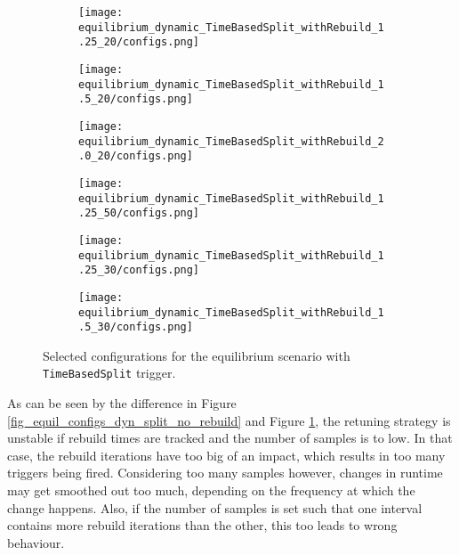 \documentclass[]{article}
\begin{document}
\begin{figure}[H]
	\begin{center}
		\begin{subfigure}[b]{0.3\textwidth}
			\texttt{[image: equilibrium\_dynamic\_TimeBasedSplit\_withRebuild\_1.25\_20/configs.png]}
		\end{subfigure}
		\begin{subfigure}[b]{0.3\textwidth}
			\texttt{[image: equilibrium\_dynamic\_TimeBasedSplit\_withRebuild\_1.5\_20/configs.png]}
		\end{subfigure}
		\begin{subfigure}[b]{0.3\textwidth}
			\texttt{[image: equilibrium\_dynamic\_TimeBasedSplit\_withRebuild\_2.0\_20/configs.png]}
		\end{subfigure}
	\end{center}
	\begin{center}
		\begin{subfigure}[b]{0.3\textwidth}
			\texttt{[image: equilibrium\_dynamic\_TimeBasedSplit\_withRebuild\_1.25\_50/configs.png]}
		\end{subfigure}
		\begin{subfigure}[b]{0.3\textwidth}
			\texttt{[image: equilibrium\_dynamic\_TimeBasedSplit\_withRebuild\_1.25\_30/configs.png]}
		\end{subfigure}
		\begin{subfigure}[b]{0.3\textwidth}
			\texttt{[image: equilibrium\_dynamic\_TimeBasedSplit\_withRebuild\_1.5\_30/configs.png]}
		\end{subfigure}
	\end{center}
	\caption[]{Selected configurations for the equilibrium scenario with \texttt{TimeBasedSplit} trigger.}
	\label{fig_equil_configs_dyn_split_with_rebuild}
\end{figure}

As can be seen by the difference in Figure \ref{fig_equil_configs_dyn_split_no_rebuild} and Figure \ref{fig_equil_configs_dyn_split_with_rebuild}, the retuning strategy is unstable if rebuild times are tracked and the number of samples is to low. In that case, the rebuild iterations have too big of an impact, which results in too many triggers being fired. Considering too many samples however, changes in runtime may get smoothed out too much, depending on the frequency at which the change happens. Also, if the number of samples is set such that one interval contains more rebuild iterations than the other, this too leads to wrong behaviour.
\end{document}
